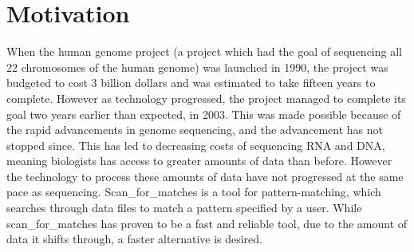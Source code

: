\section{Motivation}
When the human genome project (a project which had the goal of sequencing 
all 22 chromosomes of the human genome) was launched in 1990, the project was 
budgeted to cost 3 billion dollars and was estimated to take fifteen years 
to complete. However as technology progressed, the project managed to complete 
its goal two years earlier than expected, in 2003. This was made possible 
because of the rapid advancements in genome sequencing, and the advancement 
has not stopped since. This has led to decreasing costs of sequencing RNA and DNA, 
meaning biologists has access to greater amounts of data than before. 
However the technology to process these amounts of data have not progressed at 
the same pace as sequencing. Scan\_for\_matches is a tool for pattern-matching, 
which searches through data files to match a pattern specified by a user. 
While scan\_for\_matches has proven to be a fast and reliable 
tool, due to the amount of data it shifts through, a faster alternative 
is desired.\begin{comment}
After hearing about this problem, we thought that there must be a better 
way of searching through data that is also theoretically sound. Our first 
thought was using automata-based searching methods, since this provides a 
calculable best- and worst-case run time while being theoretically sound. 
Since regular expressions uses an automata-based way of searching, we hypothesized 
that implementing regular expressions which have the same functions as 
scan\_for\_matches would lead to faster run times.
\end{comment}

